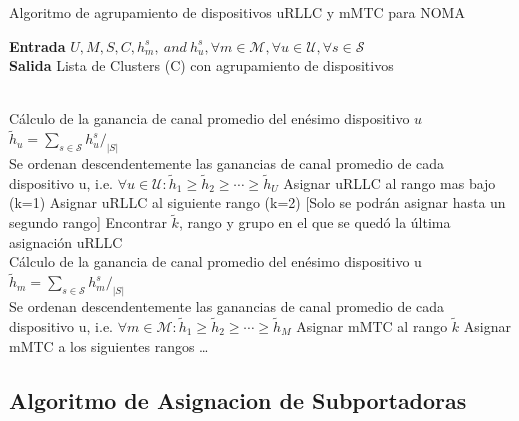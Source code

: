 \begin{algorithm}
    \caption{Algoritmo de agrupamiento de dispositivos uRLLC y mMTC para NOMA}\label{A1}
    \hspace*{\algorithmicindent} \textbf{Entrada} $U, M, S, C, h_{m}^{s} , \ and \ h_{u}^{s} ,\forall m \in \mathcal {M} , \forall u \in \mathcal {U} , \forall s \in \mathcal {S}$  \\
    \hspace*{\algorithmicindent} \textbf{Salida} Lista de Clusters (C) con agrupamiento de dispositivos 
    \begin{algorithmic}[1]
    \\
    Cálculo de la ganancia de canal promedio del enésimo dispositivo $u$\\
    ${\tilde h_{u}} =\sum \nolimits _{s \in \mathcal {S}} {h_{u}^{s}}{/_{|S|}}$\\
    Se ordenan descendentemente las ganancias de canal promedio de cada dispositivo u, i.e. $\forall u \in \mathcal {U} : {\tilde h_{1}} \geq {\tilde h_{2}} \geq \cdots \geq {\tilde h_{U}}$ 
        \State Asignar uRLLC al rango mas bajo (k=1)
        \Else
        \State Asignar uRLLC al siguiente rango (k=2) [Solo se podrán asignar hasta un segundo rango]
        \EndIf
    \EndFor
    \State Encontrar ${\tilde k}$, rango y grupo en el que se quedó la última asignación uRLLC
    \EndProcedure
    \\
    Cálculo de la ganancia de canal promedio del enésimo dispositivo u\\
    ${\tilde h_{m}} =\sum \nolimits _{s \in \mathcal {S}} {h_{m}^{s}}{/_{|S|}}$\\
    Se ordenan descendentemente las ganancias de canal promedio de cada dispositivo u, i.e. $\forall m \in \mathcal {M} : {\tilde h_{1}} \geq {\tilde h_{2}} \geq \cdots \geq {\tilde h_{M}}$ 
        \State Asignar mMTC al rango ${\tilde k}$
        \Else
        \State Asignar mMTC a los siguientes rangos \ldots
        \EndIf
    \EndFor
    \EndProcedure
    \end{algorithmic}
\end{algorithm}


\break

\subsection{Algoritmo de Asignacion de Subportadoras}

